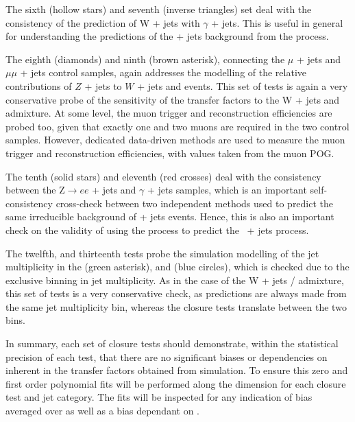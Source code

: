 The sixth (hollow stars) and seventh (inverse triangles) set deal 
with the consistency of the prediction of W + jets with $\gamma$ + jets.
This is useful in general for understanding the predictions of the \znunu + jets background from the \gj process. 

The eighth (diamonds) and ninth (brown asterisk), connecting the $\mu$ + jets 
and $\mu\mu$ + jets control samples, again addresses the modelling of 
the relative contributions of $Z$ + jets to $W$ + jets and \ttbar events.
This set of tests is again a very conservative probe of the sensitivity of the
transfer factors to the W + jets and \ttbar admixture. At some
level, the muon trigger and reconstruction efficiencies are probed
too, given that exactly one and two muons are required in the two
control samples. However, dedicated data-driven methods are used to
measure the muon trigger and reconstruction efficiencies, with values
taken from the muon POG.

The tenth (solid stars) and eleventh (red crosses) deal  with the consistency between the
Z$\rightarrow ee$ + jets and $\gamma$ + jets samples, which is an
important self-consistency cross-check between two independent methods
used to predict the same irreducible background of \znunu + jets
events. Hence, this is also an important check on the validity of
using the \gj process to predict the \znunu\, + jets process.

The twelfth, and thirteenth tests probe the simulation modelling of
the jet multiplicity in the \ej (green asterisk), and \eej 
(blue circles), which is checked due to the exclusive binning in jet multiplicity.
As in the case of the W + jets / \ttbar admixture, this set of tests is a very 
conservative check, as predictions are always made from the same 
jet multiplicity bin, whereas the closure tests translate between the two bins.

In summary, each set of closure tests should demonstrate, within the
statistical precision of each test, that there are no significant
biases or dependencies on \scalht inherent in the transfer factors
obtained from simulation. To ensure this zero and first order polynomial
fits will be performed along the \scalht dimension for each closure test 
and jet category. The fits will be inspected for any indication of bias 
averaged over \scalht as well as a bias dependant on \scalht. 

